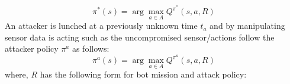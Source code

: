 \documentclass[letterpaper, 10 pt, conference]{ieeeconf}  %
\newtheorem{problem}{Problem}
\newcommand\NB[1]{$\spadesuit$\footnote{NB: #1}}
\begin{document}
\begin{equation}
\pi^*(s) = \arg\!\max_{a\in A} Q^{\pi^*}(s,a,R)
\end{equation}
An attacker is lunched at a previously unknown time $t_a$ and by manipulating sensor data is acting such as the uncompromised sensor/actions follow the attacker policy $\pi^a$ as follows:
\begin{equation}
\pi^a(s) = \arg\!\max_{a\in A} Q^{\pi^a}(s,a,R)
\end{equation}
where, $R$ has the following form for bot mission and attack policy:
%
\end{document}
